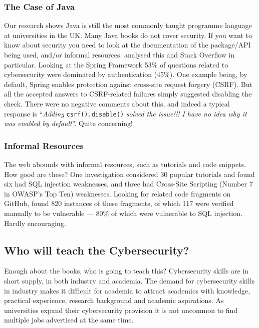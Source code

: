 \documentclass[a4paper,11pt]{article}
\begin{document}
\subsubsection*{The Case of Java}\label{sec:Java}
Our research shows Java is still the most commonly taught programme language at universities in the UK. Many Java books do not cover security.  If you want to know about security you need to look at the documentation of the package/API being used, and/or  informal resources. \cite{Mengetal2018a} analysed this and Stack Overflow in particular. Looking at the Spring Framework 53\% of questions related to cybersecurity were dominated by authentication (45\%). One example being, by default, Spring enables protection against cross-site request forgery (CSRF). But all the accepted answers to CSRF-related failures simply suggested disabling the check. There were no negative comments about this, and indeed a typical response is ``{\emph{Adding}} \verb!csrf().disable()!
{\emph{{solved the issue!!! I have no idea why it was enabled by default}}''. } Quite concerning!

\subsubsection*{Informal Resources}\label{sec:informal}
The web abounds with informal resources, such as tutorials and code snippets. How good are these? One investigation \cite{Unruhetal2017a} considered 30 popular tutorials and found six had SQL injection weaknesses, and three had Cross-Site Scripting (Number 7 in OWASP's Top Ten) weaknesses. Looking for related code fragments on GitHub, found 820 instances of these fragments, of which 117 were verified manually to be vulnerable --- 80\% of which were vulnerable to SQL injection. Hardly encouraging.


\subsection*{Who will teach the Cybersecurity?}\label{sec:staffing}
Enough about the books, who is going to teach this? Cybersecurity skills are in short supply, in both industry and academia. The demand for cybersecurity skills in industry makes it difficult for academia to attract academics with knowledge, practical experience, research background and academic aspirations. As universities expand their cybersecurity provision it is not uncommon to find multiple jobs advertised at the same time. 
\end{document}

